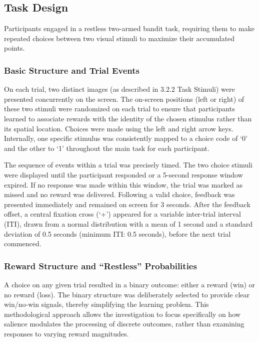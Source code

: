 \subsection{Task Design}

Participants engaged in a restless two-armed bandit task, requiring them to make repeated choices between two visual stimuli to maximize their accumulated points.

\subsubsection{Basic Structure and Trial Events}

On each trial, two distinct images (as described in 3.2.2 Task Stimuli) were presented concurrently on the screen. The on-screen positions (left or right) of these two stimuli were randomized on each trial to ensure that participants learned to associate rewards with the identity of the chosen stimulus rather than its spatial location. Choices were made using the left and right arrow keys. Internally, one specific stimulus was consistently mapped to a choice code of `0' and the other to `1' throughout the main task for each participant.

The sequence of events within a trial was precisely timed. The two choice stimuli were displayed until the participant responded or a 5-second response window expired. If no response was made within this window, the trial was marked as missed and no reward was delivered. Following a valid choice, feedback was presented immediately and remained on screen for 3 seconds. After the feedback offset, a central fixation cross (`+') appeared for a variable inter-trial interval (ITI), drawn from a normal distribution with a mean of 1 second and a standard deviation of 0.5 seconds (minimum ITI: 0.5 seconds), before the next trial commenced.

\subsubsection{Reward Structure and ``Restless'' Probabilities}

A choice on any given trial resulted in a binary outcome: either a reward (win) or no reward (loss). The binary structure was deliberately selected to provide clear win/no-win signals, thereby simplifying the learning problem. This methodological approach allows the investigation to focus specifically on how salience modulates the processing of discrete outcomes, rather than examining responses to varying reward magnitudes.

